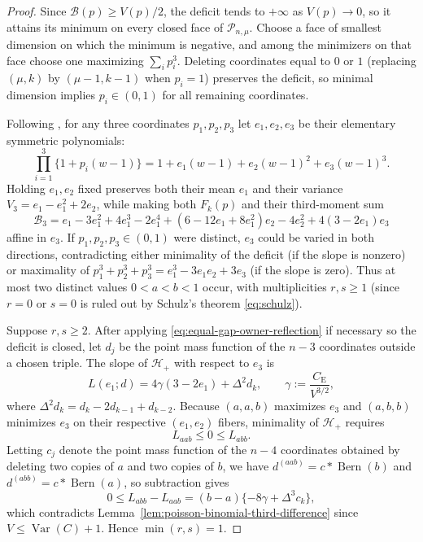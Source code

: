 \documentclass[11pt]{article}
\numberwithin{equation}{section}
\theoremstyle{definition}
\theoremstyle{remark}
\DeclareMathOperator{\Var}{Var}
\DeclareMathOperator{\Bern}{Bern}
\newcommand{\be}{C_{\mathrm E}}
\begin{document}
\begin{proof}
Since $\mathcal B(p)\geq V(p)/2$, the deficit tends to $+\infty$ as
$V(p)\to0$, so it attains its minimum on every closed face of
$\mathcal P_{n,\mu}$. Choose a face of smallest dimension on which the minimum
is negative, and among the minimizers on that face choose one maximizing
$\sum_i p_i^3$. Deleting coordinates equal to $0$ or $1$ (replacing
$(\mu,k)$ by $(\mu-1,k-1)$ when $p_i=1$) preserves the deficit, so minimal
dimension implies $p_i\in(0,1)$ for all remaining coordinates.

Following \citet[pp.~5--6]{Mattner2022}, for any three coordinates $p_1,p_2,p_3$
let $e_1,e_2,e_3$ be their elementary symmetric polynomials:
\begin{equation}
 \prod_{i=1}^3\{1+p_i(w-1)\}
 =1+e_1(w-1)+e_2(w-1)^2+e_3(w-1)^3.
 \label{eq:equal-gap-triple-generating}
\end{equation}
Holding $e_1,e_2$ fixed preserves both their mean $e_1$ and their variance
$V_3=e_1-e_1^2+2e_2$, while making both $F_k(p)$ and their third-moment sum
\begin{equation}
 \mathcal B_3=e_1-3e_1^2+4e_1^3-2e_1^4
 +(6-12e_1+8e_1^2)e_2-4e_2^2+4(3-2e_1)e_3
\label{eq:equal-gap-triple-budget}
\end{equation}
affine in $e_3$. If $p_1,p_2,p_3\in(0,1)$ were distinct, $e_3$ could be varied
in both directions, contradicting either minimality of the deficit (if the
slope is nonzero) or maximality of $p_1^3+p_2^3+p_3^3=e_1^3-3e_1e_2+3e_3$ (if
the slope is zero). Thus at most two distinct values $0<a<b<1$ occur, with
multiplicities $r,s\ge1$ (since $r=0$ or $s=0$ is ruled out by Schulz's
theorem \eqref{eq:schulz}).

Suppose $r,s\ge2$. After applying \eqref{eq:equal-gap-owner-reflection} if
necessary so the deficit is closed, let $d_j$ be the point mass function of
the $n-3$ coordinates outside a chosen triple. The slope of $\mathcal H_+$
with respect to $e_3$ is
\begin{equation}
 L(e_1;d)=4\gamma(3-2e_1)+\Delta^2d_k,
 \qquad \gamma:=\frac{\be}{V^{3/2}},
 \label{eq:equal-gap-fiber-slope}
\end{equation}
where $\Delta^2d_k=d_k-2d_{k-1}+d_{k-2}$. Because $(a,a,b)$ maximizes $e_3$
and $(a,b,b)$ minimizes $e_3$ on their respective $(e_1,e_2)$ fibers,
minimality of $\mathcal H_+$ requires
\begin{equation}
 L_{aab}\leq0\leq L_{abb}.
 \label{eq:equal-gap-fiber-endpoint-signs}
\end{equation}
Letting $c_j$ denote the point mass function of the $n-4$ coordinates obtained
by deleting two copies of $a$ and two copies of $b$, we have
$d^{(aab)}=c*\Bern(b)$ and $d^{(abb)}=c*\Bern(a)$, so subtraction gives
\begin{equation}
 0\le L_{abb}-L_{aab}
 =(b-a)\{-8\gamma+\Delta^3c_k\},
 \label{eq:equal-gap-two-block-slope-difference}
\end{equation}
which contradicts Lemma~\ref{lem:poisson-binomial-third-difference} since
$V\le\Var(C)+1$. Hence $\min(r,s)=1$.
\end{proof}
\end{document}
